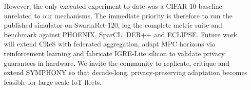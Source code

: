 \documentclass{article}
\begin{document}
However, the only executed experiment to date was a CIFAR-10 baseline unrelated to our mechanisms. The immediate priority is therefore to run the published simulator on SwarmRet-120, log the complete metric suite and benchmark against PHOENIX, SparCL, DER++ and ECLIPSE. Future work will extend CReS with federated aggregation, adapt MPC horizons via reinforcement learning and fabricate IGRE-Lite silicon to validate privacy guarantees in hardware. We invite the community to replicate, critique and extend SYMPHONY so that decade-long, privacy-preserving adaptation becomes feasible for large-scale IoT fleets.



\end{document}
